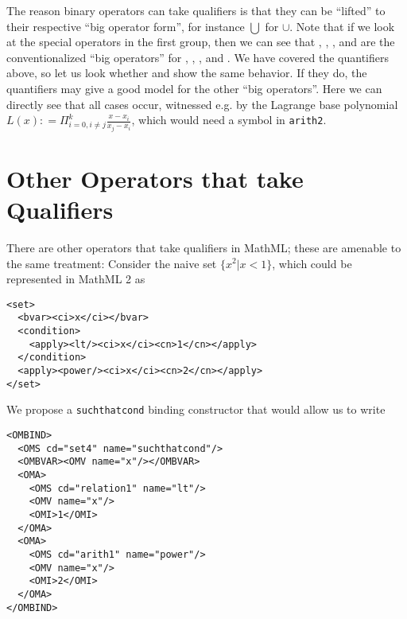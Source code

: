 \documentclass{llncs}
\begin{document}
The reason binary operators can take qualifiers is that they can be ``lifted'' to their
respective ``big operator form'', for instance $\bigcup$ for $\cup$. Note that if we look
at the special operators in the first group, then we can see that {},
{}, {}, and {} are the conventionalized
``big operators'' for {}, {}, {}, and
{}. We have covered the quantifiers above, so let us look whether
{} and {} show the same behavior. If they do, the
quantifiers may give a good model for the other ``big operators''. Here we can directly
see that all cases occur, witnessed e.g. by the Lagrange base polynomial $\displaystyle
L(x)\colon=\Pi_{i=0,i\ne j}^k\frac{x-x_i}{x_j-x_i}$, which would need a symbol
{} in {\texttt{arith2}}.

\section{Other Operators that take Qualifiers}
There are other operators that take qualifiers in MathML; these are amenable to the same
treatment: Consider the naive set $\{x^2|x<1\}$, which could be represented in MathML 2 as
\begin{lstlisting}[language=MathML2]
<set>
  <bvar><ci>x</ci></bvar>
  <condition>
    <apply><lt/><ci>x</ci><cn>1</cn></apply>
  </condition>
  <apply><power/><ci>x</ci><cn>2</cn></apply>
</set>
\end{lstlisting}
We propose a {\texttt{suchthatcond}} binding constructor that would allow us to write
\begin{lstlisting}
<OMBIND>
  <OMS cd="set4" name="suchthatcond"/>
  <OMBVAR><OMV name="x"/></OMBVAR>
  <OMA>
    <OMS cd="relation1" name="lt"/>
    <OMV name="x"/>
    <OMI>1</OMI>
  </OMA>
  <OMA>
    <OMS cd="arith1" name="power"/>
    <OMV name="x"/>
    <OMI>2</OMI>
  </OMA>  
</OMBIND>
\end{lstlisting}


\end{document}
